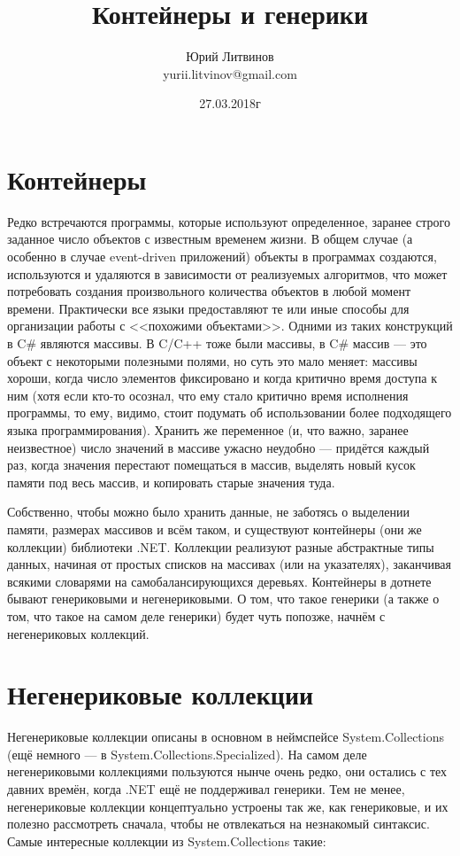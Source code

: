 \documentclass[a5paper]{article}
\title{Контейнеры и генерики}
\author{Юрий Литвинов\\\small{yurii.litvinov@gmail.com}}
\date{27.03.2018г}
\begin{document}
\maketitle
\thispagestyle{empty}

\section{Контейнеры}

Редко встречаются программы, которые используют определенное, заранее строго заданное число объектов с известным временем жизни. В общем случае (а особенно в случае event-driven приложений) объекты в программах создаются, используются и удаляются в зависимости от реализуемых алгоритмов, что может потребовать создания произвольного количества объектов в любой момент времени. Практически все языки предоставляют те или иные способы для организации работы с <<похожими объектами>>. Одними из таких конструкций в C\# являются массивы. В C/C++ тоже были массивы, в C\# массив --- это объект с некоторыми полезными полями, но суть это мало меняет: массивы хороши, когда число элементов фиксировано и когда критично время доступа к ним (хотя если кто-то осознал, что ему стало критично время исполнения программы, то ему, видимо, стоит подумать об использовании более подходящего языка программирования). Хранить же переменное (и, что важно, заранее неизвестное) число значений в массиве ужасно неудобно --- придётся каждый раз, когда значения перестают помещаться в массив, выделять новый кусок памяти под весь массив, и копировать старые значения туда.

Собственно, чтобы можно было хранить данные, не заботясь о выделении памяти, размерах массивов и всём таком, и существуют контейнеры (они же коллекции) библиотеки .NET. Коллекции реализуют разные абстрактные типы данных, начиная от простых списков на массивах (или на указателях), заканчивая всякими словарями на самобалансирующихся деревьях. Контейнеры в дотнете бывают генериковыми и негенериковыми. О том, что такое генерики (а также о том, что такое на самом деле генерики) будет чуть попозже, начнём с негенериковых коллекций.

\section{Негенериковые коллекции}

Негенериковые коллекции описаны в основном в неймспейсе System.Collections (ещё немного --- в System.Collections.Specialized). На самом деле негенериковыми коллекциями пользуются нынче очень редко, они остались с тех давних времён, когда .NET ещё не поддерживал генерики. Тем не менее, негенериковые коллекции концептуально устроены так же, как генериковые, и их полезно рассмотреть сначала, чтобы не отвлекаться на незнакомый синтаксис. Самые интересные коллекции из System.Collections такие:
\end{document}
